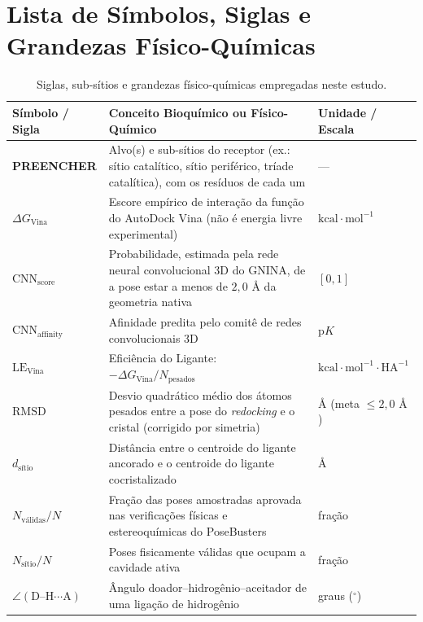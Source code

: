 \section*{Lista de Símbolos, Siglas e Grandezas Físico-Químicas} \label{section: symbols}

\begin{table}[H]
\centering
\caption{Siglas, sub-sítios e grandezas físico-químicas empregadas neste estudo.}
\vspace{4pt}
\small
\renewcommand{\arraystretch}{1.22}
\begin{tabularx}{\textwidth}{>{\bfseries}l X l}
\toprule
\textbf{Símbolo / Sigla} & \textbf{Conceito Bioquímico ou Físico-Químico} & \textbf{Unidade / Escala} \\
\midrule
PREENCHER & Alvo(s) e sub-sítios do receptor (ex.: sítio catalítico, sítio periférico, tríade catalítica), com os resíduos de cada um & --- \\
$\Delta G_{\text{Vina}}$ & Escore empírico de interação da função do AutoDock Vina (não é energia livre experimental) & $\text{kcal}\cdot\text{mol}^{-1}$ \\
$\text{CNN}_{\text{score}}$ & Probabilidade, estimada pela rede neural convolucional 3D do GNINA, de a pose estar a menos de $2,0\text{ \AA}$ da geometria nativa & $[0, 1]$ \\
$\text{CNN}_{\text{affinity}}$ & Afinidade predita pelo comitê de redes convolucionais 3D & $\text{p}K$ \\
$\text{LE}_{\text{Vina}}$ & Eficiência do Ligante: $-\Delta G_{\text{Vina}} / N_{\text{pesados}}$ & $\text{kcal}\cdot\text{mol}^{-1}\cdot\text{HA}^{-1}$ \\
$\text{RMSD}$ & Desvio quadrático médio dos átomos pesados entre a pose do \textit{redocking} e o cristal (corrigido por simetria) & $\text{\AA}$ (meta $\le 2,0\text{ \AA}$) \\
$d_{\text{sítio}}$ & Distância entre o centroide do ligante ancorado e o centroide do ligante cocristalizado & $\text{\AA}$ \\
$N_{\text{válidas}}/N$ & Fração das poses amostradas aprovada nas verificações físicas e estereoquímicas do PoseBusters & fração \\
$N_{\text{sítio}}/N$ & Poses fisicamente válidas que ocupam a cavidade ativa & fração \\
$\angle(\text{D--H}\cdots\text{A})$ & Ângulo doador--hidrogênio--aceitador de uma ligação de hidrogênio & graus ($^\circ$) \\
\bottomrule
\end{tabularx}
\end{table}
